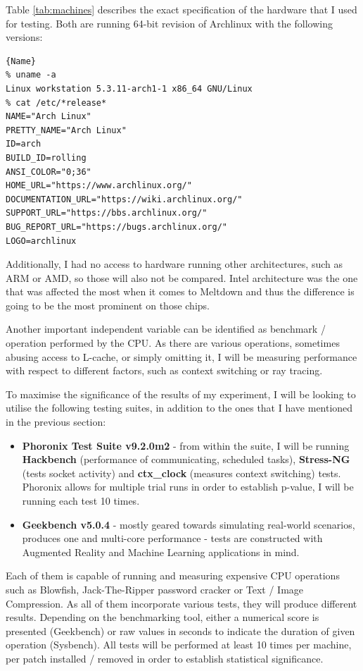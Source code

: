 \documentclass{csfourzero}
\begin{document}
Table \ref{tab:machines} describes the exact specification of the hardware that I used for testing. Both are running 64-bit revision of Archlinux with the following versions: 

\begin{lstlisting}[frame=tlrb, basicstyle=\small]{Name}
% uname -a
Linux workstation 5.3.11-arch1-1 x86_64 GNU/Linux
% cat /etc/*release*
NAME="Arch Linux"
PRETTY_NAME="Arch Linux"
ID=arch
BUILD_ID=rolling
ANSI_COLOR="0;36"
HOME_URL="https://www.archlinux.org/"
DOCUMENTATION_URL="https://wiki.archlinux.org/"
SUPPORT_URL="https://bbs.archlinux.org/"
BUG_REPORT_URL="https://bugs.archlinux.org/"
LOGO=archlinux
\end{lstlisting}

Additionally, I had no access to hardware running other architectures, such as ARM or AMD, so those will also not be compared. Intel architecture was the one that was affected the most when it comes to Meltdown and thus the difference is going to be the most prominent on those chips.

Another important independent variable can be identified as benchmark / operation performed by the CPU. As there are various operations, sometimes abusing access to L-cache, or simply omitting it, I will be measuring performance with respect to different factors, such as context switching or ray tracing.

To maximise the significance of the results of my experiment, I will be looking to utilise the following testing suites, in addition to the ones that I have mentioned in the previous section:
\begin{itemize}
  \item \textbf{Phoronix Test Suite v9.2.0m2} - from within the suite, I will be running \textbf{Hackbench} (performance of communicating, scheduled tasks), \textbf{Stress-NG} (tests socket activity) and \textbf{ctx\_clock} (measures context switching) tests. Phoronix allows for multiple trial runs in order to establish p-value, I will be running each test 10 times.
  \item \textbf{Geekbench v5.0.4} - mostly geared towards simulating real-world scenarios, produces one and multi-core performance - tests are constructed with Augmented Reality and Machine Learning applications in mind. \cite{geekbench}
\end{itemize}
Each of them is capable of running and measuring expensive CPU operations such as Blowfish, Jack-The-Ripper password cracker or Text / Image Compression. As all of them incorporate various tests, they will produce different results. Depending on the benchmarking tool, either a numerical score is presented (Geekbench) or raw values in seconds to indicate the duration of given operation (Sysbench). All tests will be performed at least 10 times per machine, per patch installed / removed in order to establish statistical significance. 
\end{document}
